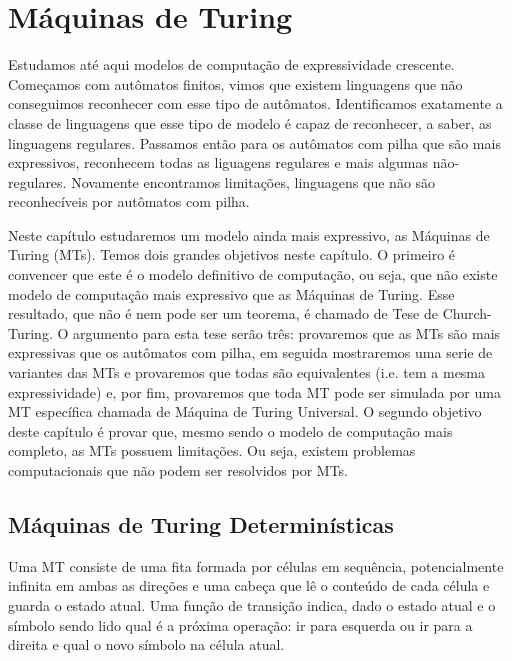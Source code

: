 \chapter{Máquinas de Turing}
\label{cha:MTs}

Estudamos até aqui modelos de computação de expressividade crescente.
Começamos com autômatos finitos, vimos que existem linguagens que não conseguimos reconhecer com esse tipo de autômatos.
Identificamos exatamente a classe de linguagens que esse tipo de modelo é capaz de reconhecer, a saber, as linguagens regulares.
Passamos então para os autômatos com pilha que são mais expressivos, reconhecem todas as liguagens regulares e mais algumas não-regulares.
Novamente encontramos limitações, linguagens que não são reconhecíveis por autômatos com pilha.

Neste capítulo estudaremos um modelo ainda mais expressivo, as Máquinas de Turing (MTs).
Temos dois grandes objetivos neste capítulo.
O primeiro é convencer que este é o modelo definitivo de computação, ou seja, que não existe modelo de computação mais expressivo que as Máquinas de Turing.
Esse resultado, que não é nem pode ser um teorema, é chamado de Tese de Church-Turing.
O argumento para esta tese serão três: provaremos que as MTs são mais expressivas que os autômatos com pilha, em seguida mostraremos uma serie de variantes das MTs e provaremos que todas são equivalentes (i.e. tem a mesma expressividade) e, por fim, provaremos que toda MT pode ser simulada por uma MT específica chamada de Máquina de Turing Universal.
O segundo objetivo deste capítulo é provar que, mesmo sendo o modelo de computação mais completo, as MTs possuem limitações. 
Ou seja, existem problemas computacionais que não podem ser resolvidos por MTs.


\section{Máquinas de Turing Determinísticas}
\label{sec:MTs}

Uma MT consiste de uma fita formada por células em sequência, potencialmente infinita em ambas as direções e uma cabeça que lê o conteúdo de cada célula e guarda o estado atual.
Uma função de transição indica, dado o estado atual e o símbolo sendo lido qual é a próxima operação: ir para esquerda ou ir para a direita e qual o novo símbolo na célula atual.

